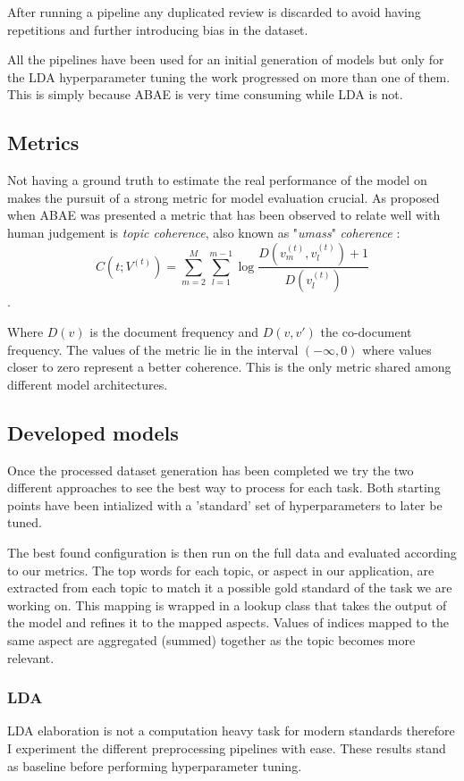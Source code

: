 After running a pipeline any duplicated review is discarded to avoid having repetitions and further introducing
bias in the dataset.

All the pipelines have been used for an initial generation of models but only for the LDA hyperparameter
tuning the work progressed on more than one of them. This is simply because ABAE is very time consuming while LDA is not.

\subsection{Metrics}
Not having a ground truth to estimate the real performance of the model on makes the pursuit of a strong metric
for model evaluation crucial.
As proposed when ABAE was presented \cite{he-etal-2017-unsupervised} a metric that has been observed to relate
well with human judgement is \textit{topic coherence}, also known as "\textit{umass}" \textit{coherence} \cite{mimno-etal-2011-optimizing}:
$$C(t;V^{(t)}) = \sum^M_{m=2} \sum^{m-1}_{l=1} \log \frac{D(v_m^{(t)}, v_l^{(t)}) + 1}{D(v_l^{(t)})} $$.

Where $D(v)$ is the document frequency and $D(v,v')$ the co-document frequency.
The values of the metric lie in the interval $(-\infty, 0)$ where values closer to zero represent a better coherence.
This is the only metric shared among different model architectures.

\subsection{Developed models}
Once the processed dataset generation has been completed we try the two different approaches to see the best way
to process for each task. Both starting points have been intialized with a 'standard' set of hyperparameters
to later be tuned.

The best found configuration is then run on the full data and evaluated according to our metrics.
The top words for each topic, or aspect in our application, are extracted from each topic to match it a possible
gold standard of the task we are working on.
This mapping is wrapped in a lookup class that takes the output of the model and refines it to the mapped aspects.
Values of indices mapped to the same aspect are aggregated (summed) together as the topic becomes more relevant.

\subsubsection{LDA}
LDA elaboration is not a computation heavy task for modern standards therefore I experiment the different
preprocessing pipelines with ease.
These results stand as baseline before performing hyperparameter tuning.

